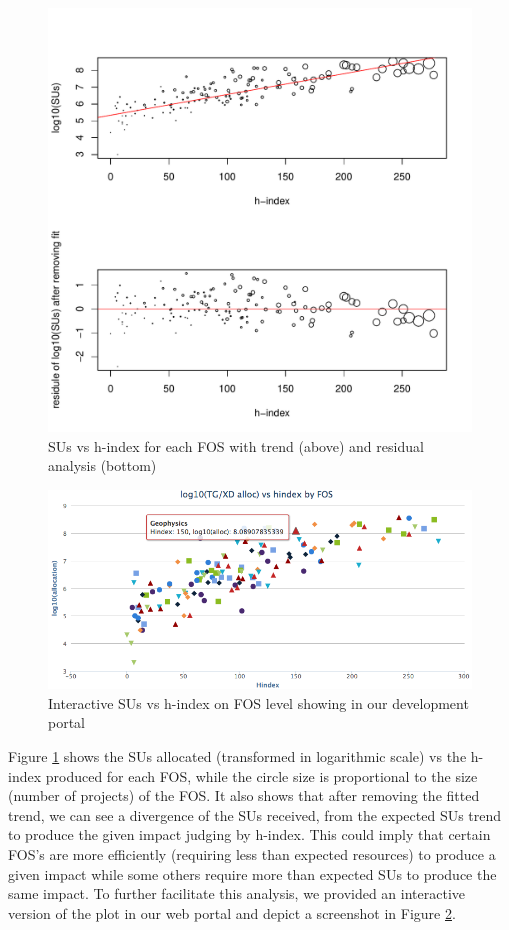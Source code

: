 \documentclass{sig-alternate}
\begin{document}
\begin{figure}[!htb] 
  \centering 
    \includegraphics[width=1.0\columnwidth]{images/05_alloc_vs_hindex_fos_sized_2in1.pdf} 
  \caption{SUs vs h-index for each FOS with trend (above) and residual analysis (bottom)}\label{F:alloc-vs-hindex-fos-sized} 
\end{figure} 
 
\begin{figure}[!htb] 
  \centering 
    \includegraphics[width=1.0\columnwidth]{images/fos_interact_portal.png} 
  \caption{Interactive SUs vs h-index on FOS level showing in our development portal}\label{F:fig3} 
\end{figure} 
 
Figure \ref{F:alloc-vs-hindex-fos-sized} shows the SUs allocated (transformed in logarithmic scale) vs the h-index produced for each FOS, while the circle size is proportional to the size (number of projects) of the FOS. It also shows that after removing the fitted trend, we can see a divergence of the SUs received, from the expected SUs trend to produce the given impact judging by h-index. This could imply that certain FOS's are more efficiently (requiring less than expected resources) to produce a given impact while some others require more than expected SUs to produce the same impact. To further facilitate this analysis, we provided an interactive version of the plot in our web portal \cite{www-tasdeviu} and depict a screenshot in Figure \ref{F:fig3}.
\end{document}
